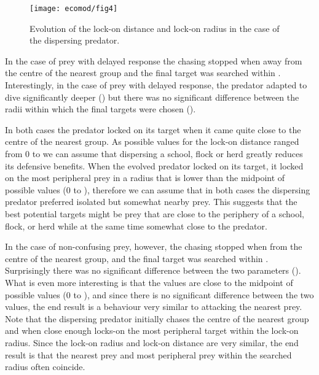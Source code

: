 \begin{figure}
	\texttt{[image: ecomod/fig4]}
	\caption{Evolution of the lock-on distance and lock-on radius in the case of the dispersing predator.}
	\label{fig:dispersing:evo}
\end{figure}

In the case of prey with delayed response the chasing stopped when   away from the centre of the nearest group and the final target was searched within  . Interestingly, in the case of prey with delayed response, the predator adapted to dive significantly deeper  () but there was no significant difference between the radii within which the final targets were chosen ().

In both cases the predator locked on its target when it came quite close to the centre of the nearest group. As possible values for the lock-on distance ranged from 0 to  we can assume that dispersing a school, flock or herd greatly reduces its defensive benefits. When the evolved predator locked on its target, it locked on the most peripheral prey in a radius that is lower than the midpoint of possible values (0 to ), therefore we can assume that in both cases the dispersing predator preferred isolated but somewhat nearby prey. This suggests that the best potential targets might be prey that are close to the periphery of a school, flock, or herd while at the same time somewhat close to the predator.

In the case of non-confusing prey, however, the chasing stopped when   from the centre of the nearest group, and the final target was searched within  . Surprisingly there was no significant difference between the two parameters (). What is even more interesting is that the values are close to the midpoint of possible values (0 to ), and since there is no significant difference between the two values, the end result is a behaviour very similar to attacking the nearest prey. Note that the dispersing predator initially chases the centre of the nearest group and when close enough locks-on the most peripheral target within the lock-on radius. Since the lock-on radius and lock-on distance are very similar, the end result is that the nearest prey and most peripheral prey within the searched radius often coincide.

